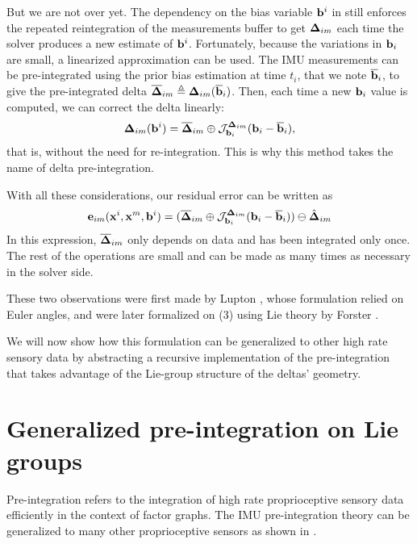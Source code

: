 But we are not over yet. The dependency on the bias variable ${\bf b}^i$ in  still enforces the repeated reintegration of the measurements buffer 
to get ${{\bm \Delta}}_{im}$ each time the solver produces a new estimate of ${\bf b}^i$. 
Fortunately, because the variations in ${\bf b}_i$ are small, a linearized approximation can be used. The IMU measurements can be pre-integrated using the prior 
bias estimation at time $t_i$, that we note $\overline{{\bf b}}_i$, to give the pre-integrated delta $\overline{{{\bm \Delta}}}_{im}\triangleq{{\bm \Delta}}_{im}(\overline{{\bf b}}_i)$.
Then, each time a new ${\bf b}_i$ value is computed, we can correct the delta linearly:
%
\begin{align}
    {{\bm \Delta}}_{im}({\bf b}^i) = \overline{{{\bm \Delta}}}_{im} \oplus {\mathcal{J}^{{{\bm \Delta}}_{im}}_{{\bf b}_i}}({\bf b}_i-\overline{{\bf b}}_i),
\end{align}
%
that is, without the need for re-integration. This is why this method takes the name of delta pre-integration.

With all these considerations, our residual error can be written as
%
\begin{align}
    {\bf e}_{im}({\bf x}^i, {\bf x}^m, {\bf b}^i) = (\overline{{{\bm \Delta}}}_{im} \oplus {\mathcal{J}^{{{\bm \Delta}}_{im}}_{{\bf b}_i}}({\bf b}_i-\overline{{\bf b}}_i) ) \ominus \hat{{{\bm \Delta}}}_{im}
    \label{eq:preint_residual}
\end{align}
%
In this expression, $\overline{{{\bm \Delta}}}_{im}$ only depends on data and has been integrated only once. The rest of the operations are small and can be made as many times as necessary in the 
solver side.

These two observations were first made by Lupton \cite{lupton-09}, whose formulation relied on Euler angles, and were later formalized on \SO(3) using Lie theory
by Forster \cite{forster2017-TRO}. 


We will now show how this formulation can be generalized to other high rate sensory data by abstracting a recursive implementation of the pre-integration that takes advantage 
of the Lie-group structure of the deltas' geometry.



\section{Generalized pre-integration on Lie groups}
\label{sec:general-preint}


Pre-integration refers to the integration of high rate proprioceptive sensory data efficiently in the context of factor graphs. 
The IMU pre-integration theory can be generalized to many other proprioceptive sensors as shown in \cite{atchuthan-18-thesis,deray-19-selfcalib,fourmy2021contact}.

